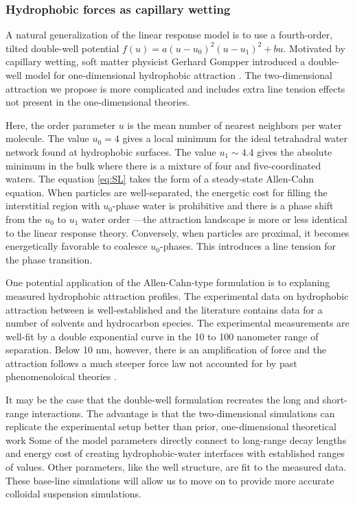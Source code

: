 \subsubsection{Hydrophobic forces as capillary wetting}
A natural generalization of the linear response model is 
to use a fourth-order, tilted double-well potential
$f(u) = a(u-u_0)^2(u-u_1)^2 + bu$.
Motivated by capillary wetting, soft matter physicist Gerhard Gompper 
introduced a double-well model for one-dimensional hydrophobic attraction
\cite{GoHaKo94}. The two-dimensional attraction we propose
is more complicated and includes extra line tension effects
not present in the one-dimensional theories. 

Here, the order parameter $u$ is the mean number of nearest
neighbors per water molecule.
The value $u_0 = 4$ gives a local minimum for the ideal
tetrahadral water network found at hydrophobic surfaces.  
The value $u_1 \sim 4.4$ gives the absolute minimum
in the bulk where there is a mixture of four and five-coordinated
waters. The equation \eqref{eq:SL} takes the form of a
steady-state Allen-Cahn equation. 
When particles are well-separated, the energetic cost for filling
the interstitial region with $u_0$-phase water is prohibitive
and there is a phase shift from the $u_0$ to $u_1$ water order
---the attraction landscape is more
or less identical to the linear response theory. Conversely, when
particles are proximal, it becomes energetically favorable
to coalesce $u_0$-phases. This introduces a line tension
for the phase transition.

One potential application of the Allen-Cahn-type formulation is to
explaning measured hydrophobic attraction profiles.
The experimental data on hydrophobic attraction between 
is well-established and the literature contains data for a number of
solvents and hydrocarbon species. The experimental measurements
are well-fit by a double exponential curve in the 10 to 100 nanometer range
of separation.  Below 10 nm, however, there is an amplification of force
and the attraction follows a much steeper force law not accounted
for by past phenomenoloical theories \cite{Lin2005}.

It may be the case that the double-well formulation recreates the
long and short-range interactions.  The advantage
is that the two-dimensional simulations can replicate the
experimental setup better than prior, one-dimensional theoretical work 
Some of the model parameters directly connect 
to long-range decay lengths and energy cost of creating hydrophobic-water
interfaces with established ranges of values. Other parameters, like the
well structure, are fit to the measured data. These base-line simulations
will allow us to move on to provide more accurate colloidal suspension
simulations. 

